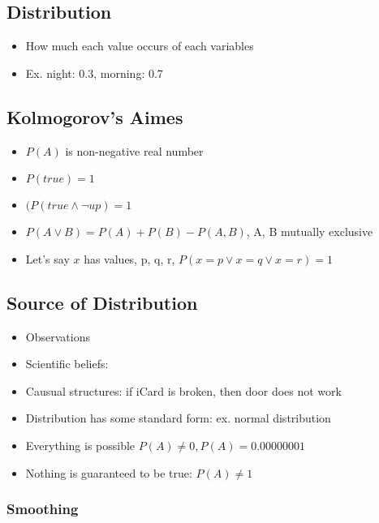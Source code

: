     \subsection{Distribution}

      \begin{itemize}
        \item How much each value occurs of each variables
        \item Ex. night: 0.3, morning: 0.7
      \end{itemize}

    \subsection{Kolmogorov's Aimes}

      \begin{itemize}
        \item $ P(A) $ is non-negative real number
        \item $ P(true) = 1 $
        \item $ (P(true \land \neg up) = 1 $
        \item $ P(A \lor B) = P(A) + P(B) - P(A, B) $, A, B mutually exclusive
        \item Let's say $ x $ has values, p, q, r, $ P(x = p \lor x = q \lor x = r) = 1 $
      \end{itemize}

    \subsection{Source of Distribution}

      \begin{itemize}
        \item Observations
        \item Scientific beliefs:
        \item Causual structures: if iCard is broken, then door does not work
        \item Distribution has some standard form: ex. normal distribution
        \item Everything is possible $ P(A) \ne 0, P(A) = 0.00000001 $
        \item Nothing is guaranteed to be true: $ P(A) \ne 1 $
      \end{itemize}

    \subsubsection{Smoothing}

